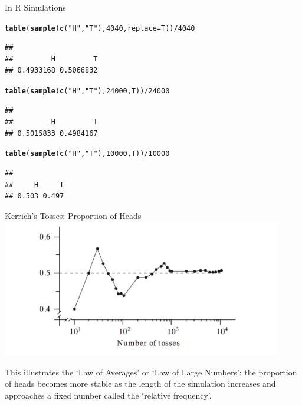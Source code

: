 \documentclass[t,xcolor=pdftex,dvipsnames,table]{beamer}
\makeatletter
\newcommand{\hlnum}[1]{\textcolor[rgb]{0.686,0.059,0.569}{#1}}%
\newcommand{\hlstr}[1]{\textcolor[rgb]{0.192,0.494,0.8}{#1}}%
\newcommand{\hlopt}[1]{\textcolor[rgb]{0,0,0}{#1}}%
\newcommand{\hlstd}[1]{\textcolor[rgb]{0.345,0.345,0.345}{#1}}%
\newcommand{\hlkwc}[1]{\textcolor[rgb]{0.333,0.667,0.333}{#1}}%
\newcommand{\hlkwd}[1]{\textcolor[rgb]{0.737,0.353,0.396}{\textbf{#1}}}%
\newenvironment{kframe}{%
 \def\at@end@of@kframe{}%
 \ifinner\ifhmode%
  \def\at@end@of@kframe{\end{minipage}}%
  \begin{minipage}{\columnwidth}%
 \fi\fi%
 \def\FrameCommand##1{\hskip\@totalleftmargin \hskip-\fboxsep
 \colorbox{shadecolor}{##1}\hskip-\fboxsep
     \hskip-\linewidth \hskip-\@totalleftmargin \hskip\columnwidth}%
 \MakeFramed {\advance\hsize-\width
   \@totalleftmargin\z@ \linewidth\hsize
   \@setminipage}}%
 {\par\unskip\endMakeFramed%
 \at@end@of@kframe}
\newenvironment{knitrout}{}{} %
\makeatother
\begin{document}
\begin{frame}[fragile]{}

In R Simulations

\begin{knitrout}
\color{fgcolor}\begin{kframe}
\begin{alltt}
\hlkwd{table}\hlstd{(}\hlkwd{sample}\hlstd{(}\hlkwd{c}\hlstd{(}\hlstr{"H"}\hlstd{,}\hlstr{"T"}\hlstd{),}\hlnum{4040}\hlstd{,}\hlkwc{replace}\hlstd{=T))}\hlopt{/}\hlnum{4040}
\end{alltt}
\begin{verbatim}
## 
##         H         T 
## 0.4933168 0.5066832
\end{verbatim}
\begin{alltt}
\hlkwd{table}\hlstd{(}\hlkwd{sample}\hlstd{(}\hlkwd{c}\hlstd{(}\hlstr{"H"}\hlstd{,}\hlstr{"T"}\hlstd{),}\hlnum{24000}\hlstd{,T))}\hlopt{/}\hlnum{24000}
\end{alltt}
\begin{verbatim}
## 
##         H         T 
## 0.5015833 0.4984167
\end{verbatim}
\begin{alltt}
\hlkwd{table}\hlstd{(}\hlkwd{sample}\hlstd{(}\hlkwd{c}\hlstd{(}\hlstr{"H"}\hlstd{,}\hlstr{"T"}\hlstd{),}\hlnum{10000}\hlstd{,T))}\hlopt{/}\hlnum{10000}
\end{alltt}
\begin{verbatim}
## 
##     H     T 
## 0.503 0.497
\end{verbatim}
\end{kframe}
\end{knitrout}

\end{frame}

\begin{frame}{}
Kerrich's Tosses: Proportion of Heads
\includegraphics[height=6cm]{../images/KerrichTosses.jpg}

This illustrates the `Law of Averages' or `Law of Large Numbers': the proportion of heads becomes more stable as the length of the simulation increases and approaches a fixed number called the `relative frequency'.

\end{frame}
\end{document}
